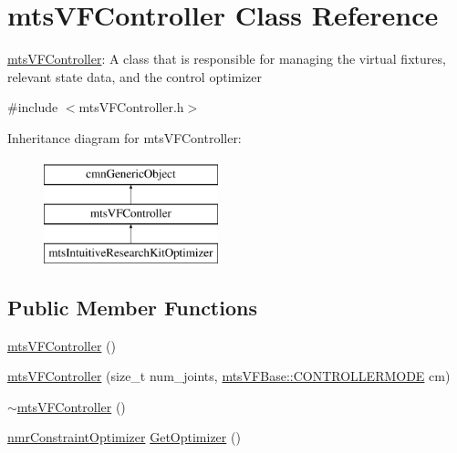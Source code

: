 \hypertarget{classmts_v_f_controller}{\section{mts\-V\-F\-Controller Class Reference}
\label{classmts_v_f_controller}
}


\hyperlink{classmts_v_f_controller}{mts\-V\-F\-Controller}\-: A class that is responsible for managing the virtual fixtures, relevant state data, and the control optimizer  




{\ttfamily \#include $<$mts\-V\-F\-Controller.\-h$>$}

Inheritance diagram for mts\-V\-F\-Controller\-:\begin{figure}[H]
\begin{center}
\leavevmode
\includegraphics[height=3.000000cm]{d7/d50/classmts_v_f_controller}
\end{center}
\end{figure}
\subsection*{Public Member Functions}
\begin{DoxyCompactItemize}
\item 
\hyperlink{classmts_v_f_controller_a4852cd5a49f4053999790a3c9fb05b3d}{mts\-V\-F\-Controller} ()
\item 
\hyperlink{classmts_v_f_controller_a6c9766a12eaafd7126ee59f2606d3451}{mts\-V\-F\-Controller} (size\-\_\-t num\-\_\-joints, \hyperlink{classmts_v_f_base_a742dd08f8b70bafeb746cec14d9ee974}{mts\-V\-F\-Base\-::\-C\-O\-N\-T\-R\-O\-L\-L\-E\-R\-M\-O\-D\-E} cm)
\item 
\hyperlink{classmts_v_f_controller_a9c553a9d908536461904bc05028f0c34}{$\sim$mts\-V\-F\-Controller} ()
\item 
\hyperlink{classnmr_constraint_optimizer}{nmr\-Constraint\-Optimizer} \hyperlink{classmts_v_f_controller_a1e6ca19fdd65c028e1fd78b6f82ea084}{Get\-Optimizer} ()
\end{DoxyCompactItemize}
